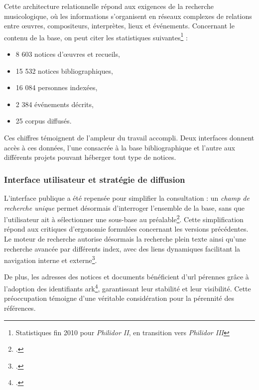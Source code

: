 Cette architecture relationnelle répond aux exigences de la recherche musicologique, où les informations s'organisent en réseaux complexes de relations entre œuvres, compositeurs, interprètes, lieux et événements. Concernant le contenu de la base, on peut citer les statistiques suivantes\footnote{Statistiques fin 2010 pour \textit{Philidor II}, en transition vers \textit{Philidor III}} :

\begin{itemize}
	\item 8 603 notices d'œuvres et recueils,
	\item 15 532 notices bibliographiques,
	\item 16 084 personnes indexées,
	\item 2 384 événements décrits,
	\item 25 corpus diffusés.
\end{itemize}

Ces chiffres témoignent de l'ampleur du travail accompli. Deux interfaces donnent accès à ces données, l'une consacrée à la base bibliographique et l'autre aux différents projets pouvant héberger tout type de notices.

\subsubsection{Interface utilisateur et stratégie de diffusion}

L'interface publique a été repensée pour simplifier la consultation : un \textit{champ de recherche unique} permet désormais d'interroger l'ensemble de la base, sans que l'utilisateur ait à sélectionner une sous-base au préalable\footcite[Rapport sur le projet Philidor de Jérémie Crublet, juin 2006]{michelbenoitDocumentationTechniqueBibliographique1997}. Cette simplification répond aux critiques d'ergonomie formulées concernant les versions précédentes. Le moteur de recherche autorise désormais la recherche plein texte ainsi qu'une recherche avancée par différents index, avec des liens dynamiques facilitant la navigation interne et externe\footcite[Présentation de la base de données PHILIDOR en Octobre 2010]{michelbenoitDocumentationTechniqueBibliographique1997}.

De plus, les adresses des notices et documents bénéficient d'\gls{url} pérennes grâce à l'adoption des identifiants \gls{ark}\footcite[Rapport sur le projet Philidor de Jérémie Crublet, juin 2006]{michelbenoitDocumentationTechniqueBibliographique1997}, garantissant leur stabilité et leur visibilité. Cette préoccupation témoigne d'une véritable considération pour la pérennité des références.

